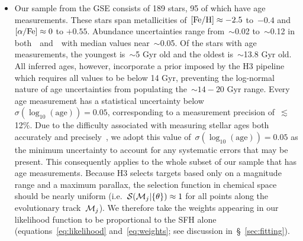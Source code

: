 \documentclass[ms.tex]{subfiles}
\begin{document}
\begin{itemize}

	\item Our sample from the GSE consists of 189 stars, 95 of which have
	age measurements.
	These stars span metallicities of~$\text{[Fe/H]} \approx -2.5$ to~$-0.4$ and
	$\text{[$\alpha$/Fe]} \approx 0$ to $+0.55$.
	Abundance uncertainties range from~$\sim$0.02 to~$\sim$0.12 in
	both~\feh~and~\afe~with median values near~$\sim$0.05.
	Of the stars with age measurements, the youngest is~$\sim$5 Gyr old and the
	oldest is~$\sim$13.8 Gyr old.
	All inferred ages, however, incorporate a prior imposed by the H3 pipeline
	which requires all values to be below 14 Gyr, preventing the log-normal
	nature of age uncertainties from populating the~$\sim14 - 20$ Gyr range.
	Every age measurement has a statistical uncertainty below
	$\sigma(\log_{10}(\text{age})) = 0.05$, corresponding to a measurement
	precision of~$\lesssim$12\%.
	Due to the difficulty associated with measuring stellar ages both
	accurately and precisely~\citep{Soderblom2010, Chaplin2013}, we adopt this
	value of~$\sigma(\log_{10}(\text{age})) = 0.05$ as the minimum uncertainty
	to account for any systematic errors that may be present.
	This consequently applies to the whole subset of our sample that has age
	measurements.
	Because H3 selects targets based only on a magnitude range and a maximum
	parallax, the selection function in chemical space should be nearly
	uniform (i.e.~$\mathcal{S}(\mathcal{M}_j | \{\theta\}) \approx 1$ for all
	points along the evolutionary track~$\mathcal{M}_j$).
	We therefore take the weights appearing in our likelihood function to be
	proportional to the SFH alone (equations~\ref{eq:likelihood}
	and~\ref{eq:weights}; see discussion in~\S~\ref{sec:fitting}).


\end{itemize}
\end{document}
